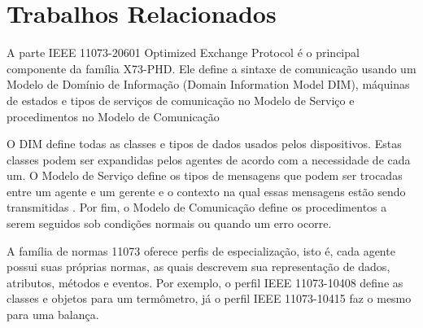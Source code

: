 \section{Trabalhos Relacionados}\label{relatedworks}

A parte IEEE 11073-20601 Optimized Exchange Protocol é o principal componente da família X73-PHD. Ele define a sintaxe de comunicação usando um Modelo de Domínio de Informação (Domain Information Model DIM), máquinas de estados e tipos de serviços de comunicação no Modelo de Serviço e procedimentos no Modelo de Comunicação

O DIM define todas as classes e tipos de dados usados pelos dispositivos. Estas classes podem ser expandidas pelos agentes de acordo com a necessidade de cada um. O Modelo de Serviço define os tipos de mensagens que podem ser trocadas entre um agente e um gerente e o contexto na qual essas mensagens estão sendo transmitidas \cite{b17}. Por fim, o Modelo de Comunicação define os procedimentos a serem seguidos sob condições normais ou quando um erro ocorre.

A família de normas 11073 oferece perfis de especialização, isto é, cada agente possui suas próprias normas, as quais descrevem sua representação de dados, atributos, métodos e eventos. Por exemplo, o perfil IEEE 11073-10408 define as classes e objetos para um termômetro, já o perfil IEEE 11073-10415 faz o mesmo para uma balança. 

